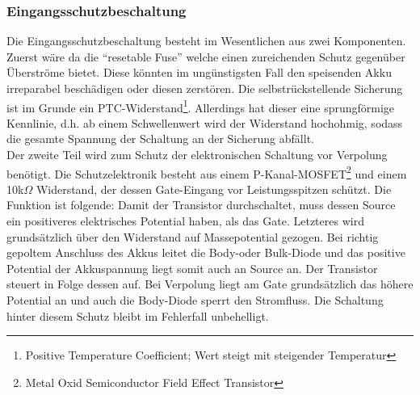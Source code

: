 \documentclass[12pt]{scrreprt} %
\begin{document}
\subsubsection{Eingangsschutzbeschaltung}
Die Eingangsschutzbeschaltung besteht im Wesentlichen aus zwei Komponenten. Zuerst wäre da die "`resetable Fuse"' welche einen zureichenden Schutz gegenüber Überströme bietet. Diese könnten im ungünstigsten Fall den speisenden Akku irreparabel beschädigen oder diesen zerstören. Die selbstrückstellende Sicherung ist im Grunde ein PTC-Widerstand\footnote{Positive Temperature Coefficient; Wert steigt mit steigender Temperatur}. Allerdings hat dieser eine sprungförmige Kennlinie, d.h. ab einem Schwellenwert wird der Widerstand hochohmig, sodass die gesamte Spannung der Schaltung an der Sicherung abfällt.\\
Der zweite Teil wird zum Schutz der elektronischen Schaltung vor Verpolung benötigt. Die Schutzelektronik besteht aus einem P-Kanal-MOSFET\footnote{Metal Oxid Semiconductor Field Effect Transistor} und einem 10k$\Omega$ Widerstand, der dessen Gate-Eingang vor Leistungsspitzen schützt. Die Funktion ist folgende: Damit der Transistor durchschaltet, muss dessen Source ein positiveres elektrisches Potential haben, als das Gate. Letzteres wird grundsätzlich über den Widerstand auf Massepotential gezogen. Bei richtig gepoltem Anschluss des Akkus leitet die Body-oder Bulk-Diode und das positive Potential der Akkuspannung liegt somit auch an Source an. Der Transistor steuert in Folge dessen auf. Bei Verpolung liegt am Gate grundsätzlich das höhere Potential an und auch die Body-Diode sperrt den Stromfluss. Die Schaltung hinter diesem Schutz bleibt im Fehlerfall unbehelligt. 
\end{document}
